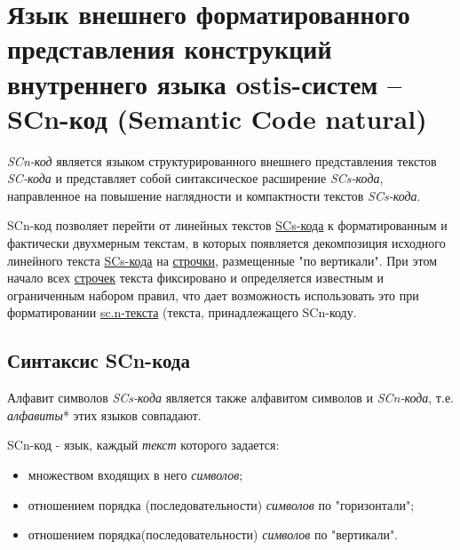 \section{Язык внешнего форматированного представления конструкций внутреннего языка ostis-систем -- SCn-код (Semantic Code natural)}
\label{sec_scn}


\begin{SCn}
\end{SCn}

\textit{SCn-код} является языком структурированного внешнего представления текстов \textit{SC-кода} и представляет собой синтаксическое расширение \textit{SCs-кода}, направленное на повышение наглядности и компактности текстов \textit{SCs-кода}. 

SCn-код позволяет перейти от линейных текстов \uline{SCs-кода} к форматированным и фактически двухмерным текстам, в которых появляется декомпозиция исходного линейного текста \uline{SCs-кода} на \uline{строчки}, размещенные "по вертикали". При этом начало всех \uline{строчек} текста фиксировано и определяется известным и ограниченным набором правил, что дает возможность использовать это при форматировании \uline{sc.n-текста} (текста, принадлежащего SCn-коду.


\subsection{Синтаксис SCn-кода}

Алфавит символов \textit{SCs-кода} является также алфавитом символов и \textit{SCn-кода}, т.е. \textit{алфавиты}* этих языков совпадают.

SCn-код - язык, каждый \textit{текст} которого задается:
\begin{itemize}
	\item множеством входящих в него \textit{символов};
	\item отношением порядка (последовательности) \textit{символов} по "горизонтали"{};
	\item отношением порядка(последовательности) \textit{символов} по "вертикали".
\end{itemize}

\begin{SCn}
\end{SCn}

